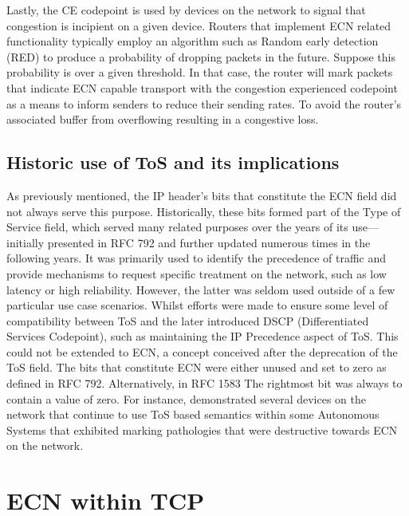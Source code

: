 \documentclass{l4proj}
\begin{document}
Lastly, the CE codepoint is used by devices on the network to signal that congestion is incipient on a given device. Routers that implement ECN related functionality typically employ an algorithm such as Random early detection (RED) to produce a probability of dropping packets in the future. Suppose this probability is over a given threshold. In that case, the router will mark packets that indicate ECN capable transport with the congestion experienced codepoint as a means to inform senders to reduce their sending rates. To avoid the router's associated buffer from overflowing resulting in a congestive loss.

\subsection{Historic use of ToS and its implications}

As previously mentioned, the IP header's bits that constitute the ECN field did not always serve this purpose. Historically, these bits formed part of the Type of Service field, which served many related purposes over the years of its use—initially presented in RFC 792 and further updated numerous times in the following years. It was primarily used to identify the precedence of traffic and provide mechanisms to request specific treatment on the network, such as low latency or high reliability. However, the latter was seldom used outside of a few particular use case scenarios. Whilst efforts were made to ensure some level of compatibility between ToS and the later introduced DSCP (Differentiated Services Codepoint), such as maintaining the IP Precedence aspect of ToS. This could not be extended to ECN, a concept conceived after the deprecation of the ToS field. The bits that constitute ECN were either unused and set to zero as defined in RFC 792. Alternatively, in RFC 1583 The rightmost bit was always to contain a value of zero. For instance, \cite{custura_exploring_2017} demonstrated several devices on the network that continue to use ToS based semantics within some Autonomous Systems that exhibited marking pathologies that were destructive towards ECN on the network.

\section{ECN within TCP}
\end{document}
